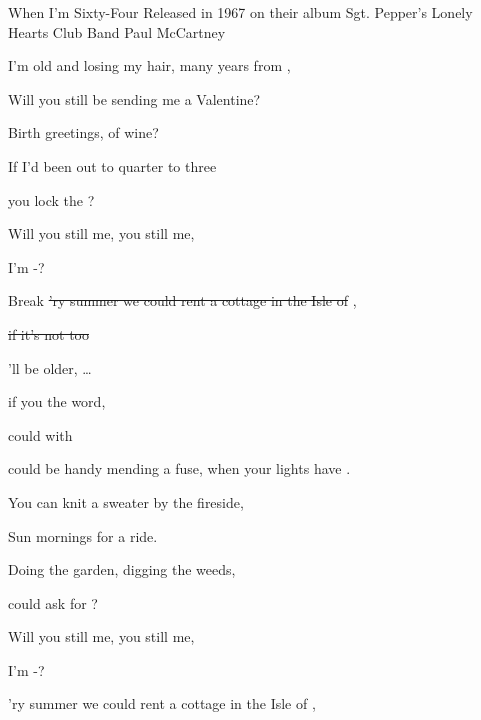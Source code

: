 \begin{SBSong}{When I'm Sixty-Four}
  {Released in 1967 on their album Sgt. Pepper's Lonely Hearts Club Band}
  {Paul McCartney}
  \begin{SBVerse}
     I'm old and losing my hair, many years from ,
    
    Will you still be sending me a Valentine?
    
    Birth greetings,  of wine?
    
    If I'd been out to quarter to three
    
     you lock the ?
    
    Will you still  me,  you still  me,
    
     I'm -?
  \end{SBVerse}
  \begin{SBBracket}{Break}
    \sout{'ry summer we could rent a cottage in the Isle of },
    
    \sout{if it's not too }
  
    'll be older,  \dots
    
     if you  the word,
    
     could  with  
  \end{SBBracket}
  \begin{SBVerse}
     could be handy mending a fuse, when your lights have .
    
    You can knit a sweater by the fireside,
    
    Sun mornings  for a ride.
    
    Doing the garden, digging the weeds,
    
     could ask for ?
    
    Will you still  me,  you still  me,
    
     I'm -?
  \end{SBVerse}
  \CBPageBrk
  \begin{SBVerse}
    'ry summer we could rent a cottage in the Isle of ,
    

\end{SBVerse}
\end{SBSong}
